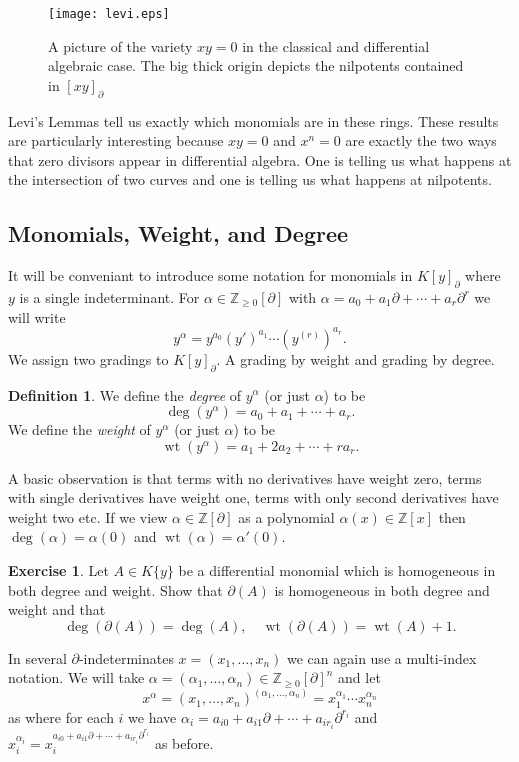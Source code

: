 \documentclass[12pt]{book}
\numberwithin{equation}{section}
\theoremstyle{definition}
\newtheorem{definition}[theorem]{Definition}
\newtheorem{exercise}[theorem]{Exercise}
\theoremstyle{remark}
\newcommand{\ZZ}{\mathbb{Z}}
\newcommand{\wt}{\operatorname{wt}}
\begin{document}
\begin{figure}[h]
	\begin{center}
		\texttt{[image: levi.eps]}
	\end{center}
	\caption{A picture of the variety $xy=0$ in the classical and differential algebraic case. 
		The big thick origin depicts the nilpotents contained in $[xy]_{\partial}$}
\end{figure}
Levi's Lemmas tell us exactly which monomials are in these rings. 
These results are particularly interesting because $xy=0$ and $x^n=0$ are exactly the two ways that zero divisors appear in differential algebra. 
One is telling us what happens at the intersection of two curves and one is telling us what happens at nilpotents.

\subsection{Monomials, Weight, and Degree}
It will be conveniant to introduce some notation for monomials in $K[ y ]_{\partial}$ where $y$ is a single indeterminant. 
For $\alpha \in \ZZ_{\geq 0}[\partial]$ with $\alpha = a_0 + a_1 \partial + \cdots + a_r \partial^r$ we will write 
$$ y^{\alpha} = y^{a_0} (y')^{a_1} \cdots (y^{(r)})^{a_r}.$$
We assign two gradings to $K[y]_{\partial}$. 
A grading by weight and grading by degree. 
\begin{definition}
We define the \emph{degree} of $y^{\alpha}$ (or just $\alpha$) to be 
$$\deg(y^{\alpha}) = a_0 + a_1 + \cdots + a_r.$$
We define the \emph{weight} of $y^{\alpha}$ (or just $\alpha$) to be
$$ \wt(y^{\alpha}) = a_1 + 2a_2 + \cdots + r a_r.$$
\end{definition}
A basic observation is that terms with no derivatives have weight zero, terms with single derivatives have weight one, terms with only second derivatives have weight two etc. 
If we view $\alpha \in \ZZ[\partial]$ as a polynomial $\alpha(x) \in \ZZ[x]$ then $\deg(\alpha) = \alpha(0)$ and $\wt(\alpha) = \alpha'(0)$. 

\begin{exercise}
	Let $A \in K\lbrace y \rbrace$ be a differential monomial which is homogeneous in both degree and weight. Show that $\partial(A)$ is homogeneous in both degree and weight and that 
	$$ \deg(\partial(A)) = \deg(A), \quad \wt(\partial(A)) = \wt(A)+1.$$
\end{exercise}

In several $\partial$-indeterminates $x=(x_1,\ldots,x_n)$ we can again use a multi-index notation. 
We will take $\alpha = (\alpha_1,\ldots,\alpha_n) \in \ZZ_{\geq 0}[\partial]^n$ and let 
$$ x^{\alpha} = (x_1,\ldots,x_n)^{(\alpha_1,\ldots,\alpha_n)} = x_1^{\alpha_1}\cdots x_n^{\alpha_n}$$
as where for each $i$ we have $\alpha_i = a_{i0} + a_{i1}\partial + \cdots + a_{ir_i}\partial^{r_i}$ and $x_i^{\alpha_i} = x_i^{a_{i0} + a_{i1}\partial + \cdots + a_{ir_i}\partial^{r_i}}$ as before. 
\end{document}
